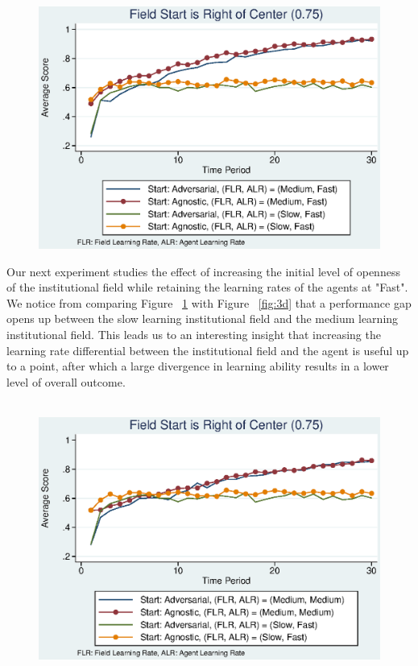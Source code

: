 \documentclass[12pt,letterpaper]{article}
\begin{document}
\begin{figure}[h]
\begin{centering}
  \includegraphics[width=\textwidth]{frcmedium3e}
  \caption{}
  \label{fig:3e}
\end{centering}
\end{figure}

\noindent Our next experiment studies the effect of increasing the initial level of openness of the institutional field while retaining the learning rates of the agents at "Fast". We notice from comparing Figure ~\ref{fig:3e} with Figure ~\ref{fig:3d} that a performance gap opens up between the slow learning institutional field and the medium learning institutional field. This leads us to an interesting insight that increasing the learning rate differential between the institutional field and the agent is useful up to a point, after which a large divergence in learning ability results in a lower level of overall outcome.\\\\
\begin{figure}[h]
\begin{centering}
  \includegraphics[width=\textwidth]{frcmedium3f}
  \caption{}
  \label{fig:3f}
\end{centering}
\end{figure}
\end{document}
